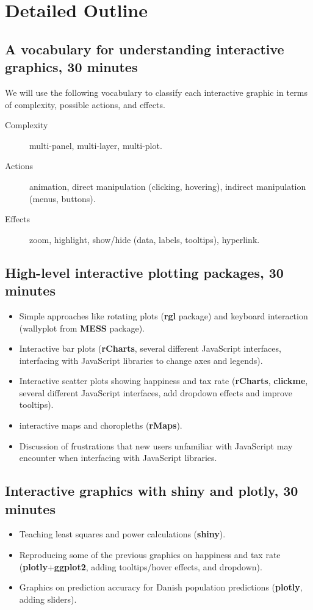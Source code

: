 \documentclass[11pt]{article}
\begin{document}
\section*{Detailed Outline}
\label{sec:orgheadline10}

\subsection*{A vocabulary for understanding interactive graphics, 30 minutes}
\label{sec:orgheadline7}

We will use the following vocabulary to classify each interactive
graphic in terms of complexity, possible actions, and effects.

\begin{description}
\item[Complexity] multi-panel, multi-layer, multi-plot.
\item[Actions] animation, direct manipulation (clicking, hovering), indirect manipulation
  (menus, buttons).
\item[Effects] zoom, highlight, show/hide (data, labels, tooltips),
  hyperlink.
\end{description}

\subsection*{High-level interactive plotting packages, 30 minutes}
\begin{itemize}
\item Simple approaches like rotating plots (\textbf{rgl} package) and
  keyboard interaction (wallyplot from \textbf{MESS} package).
\item Interactive bar plots (\textbf{rCharts}, several different JavaScript
  interfaces, interfacing with JavaScript libraries to change axes
  and legends).
\item Interactive scatter plots showing happiness and tax rate
  (\textbf{rCharts}, \textbf{clickme}, several different JavaScript
  interfaces, add dropdown effects and improve tooltips).
\item interactive maps and choropleths (\textbf{rMaps}).
\item Discussion of frustrations that new users unfamiliar with
  JavaScript may encounter when interfacing with JavaScript libraries.
\end{itemize}

\subsection*{Interactive graphics with shiny and plotly, 30 minutes}
\begin{itemize}
\item Teaching least squares and power calculations (\textbf{shiny}).
\item Reproducing some of the previous graphics on happiness and tax
  rate (\textbf{plotly}+\textbf{ggplot2}, adding tooltips/hover
  effects, and dropdown).
\item Graphics on prediction accuracy for Danish population predictions
  (\textbf{plotly}, adding sliders).
\end{itemize}
\end{document}
